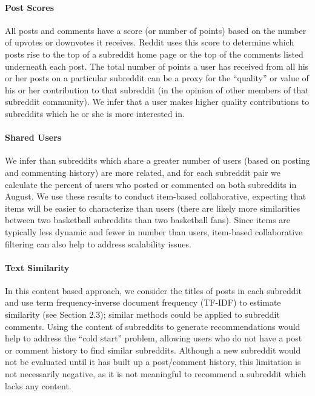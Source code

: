 \documentclass{article}
\begin{document}
\paragraph{Post Scores} All posts and comments have a score (or number of points) based on the number of upvotes or downvotes it receives.  Reddit uses this score to determine which posts rise to the top of a subreddit home page or the top of the comments listed underneath each post.  The total number of points a user has received from all his or her posts on a particular subreddit can be a proxy for the “quality” or value of his or her contribution to that subreddit (in the opinion of other members of that subreddit community).  We infer that a user makes higher quality contributions to subreddits which he or she is more interested in.

\paragraph{Shared Users} We infer than subreddits which share a greater number of users (based on posting and commenting history) are more related, and for each subreddit pair we calculate the percent of users who posted or commented on both subreddits in August.  We use these results to conduct item-based collaborative, expecting that items will be easier to characterize than users (there are likely more similarities between two basketball subreddits than two basketball fans).  Since items are typically less dynamic and fewer in number than users, item-based collaborative filtering can also help to address scalability issues.

\paragraph{Text Similarity} In this content based approach, we consider the titles of posts in each subreddit and use term frequency-inverse document frequency (TF-IDF) to estimate similarity (see Section 2.3); similar methods could be applied to subreddit comments. Using the content of subreddits to generate recommendations would help to address the “cold start” problem, allowing users who do not have a post or comment history to find similar subreddits.  Although a new subreddit would not be evaluated until it has built up a post/comment history, this limitation is not necessarily negative, as it is not meaningful to recommend a subreddit which lacks any content.
\end{document}
